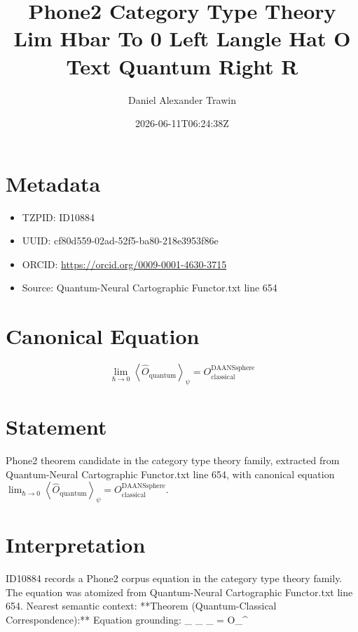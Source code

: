 \documentclass[11pt]{article}
\title{Phone2 Category Type Theory Lim Hbar To 0 Left Langle Hat O Text Quantum Right R}
\author{Daniel Alexander Trawin}
\date{2026-06-11T06:24:38Z}
\begin{document}
\maketitle
\section*{Metadata}
\begin{itemize}
\item TZPID: ID10884
\item UUID: cf80d559-02ad-52f5-ba80-218e3953f86e
\item ORCID: \url{https://orcid.org/0009-0001-4630-3715}
\item Source: Quantum-Neural Cartographic Functor.txt line 654
\end{itemize}
\section*{Canonical Equation}
\[
\lim_{\hbar \to 0} \left\langle \hat{O}_{\text{quantum}} \right\rangle_{\psi} = O_{\text{classical}}^{\text{DAANSsphere}}
\]
\section*{Statement}
Phone2 theorem candidate in the category type theory family, extracted from Quantum-Neural Cartographic Functor.txt line 654, with canonical equation $\lim_{\hbar \to 0} \left\langle \hat{O}_{\text{quantum}} \right\rangle_{\psi} = O_{\text{classical}}^{\text{DAANSsphere}}$.
\section*{Interpretation}
ID10884 records a Phone2 corpus equation in the category type theory family. The equation was atomized from Quantum-Neural Cartographic Functor.txt line 654. Nearest semantic context: **Theorem (Quantum-Classical Correspondence):** Equation grounding: \lim_{\hbar {}} \left\langle {}_{} \right\rangle_{\psi} = O_{}^{}
\end{document}
